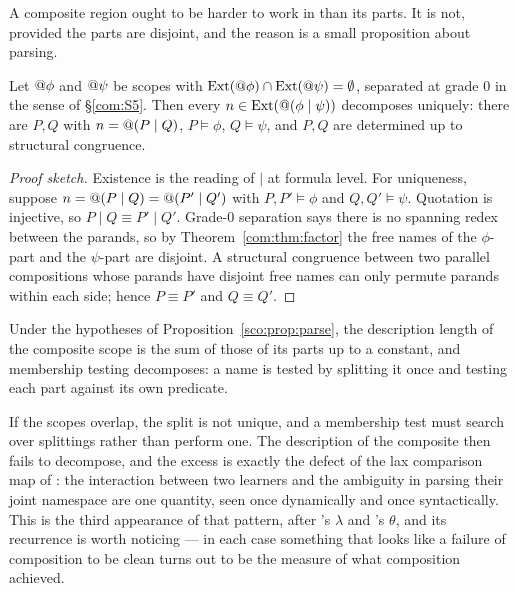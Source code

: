 A composite region ought to be harder to work in than its parts. It is
not, provided the parts are disjoint, and the reason is a small
proposition about parsing.

\begin{proposition}
\label{sco:prop:parse}
Let $@\phi$ and $@\psi$ be scopes with
$\mathrm{Ext}(@\phi) \cap \mathrm{Ext}(@\psi) = \emptyset$, separated at grade
$0$ in the sense of \S\ref{com:S5}. Then every
$n \in \mathrm{Ext}(@(\phi \mid \psi))$ decomposes uniquely: there are $P, Q$
with $n = @(P \mid Q)$, $P \models \phi$, $Q \models \psi$, and $P,Q$
are determined up to structural congruence.
\end{proposition}

\begin{proof}[Proof sketch]
Existence is the reading of $\mid$ at formula level. For uniqueness,
suppose $n = @(P \mid Q) = @(P' \mid Q')$ with
$P, P' \models \phi$ and $Q, Q' \models \psi$. Quotation is injective, so
$P \mid Q \equiv P' \mid Q'$. Grade-$0$ separation says there is no
spanning redex between the parands, so by
Theorem~\ref{com:thm:factor} the free names of the $\phi$-part and the
$\psi$-part are disjoint. A structural congruence between two parallel
compositions whose parands have disjoint free names can only permute
parands within each side; hence $P \equiv P'$ and $Q \equiv Q'$.
\end{proof}

\begin{corollary}
\label{sco:cor:additive}
Under the hypotheses of Proposition~\ref{sco:prop:parse}, the description
length of the composite scope is the sum of those of its parts up to a
constant, and membership testing decomposes: a name is tested by splitting
it once and testing each part against its own predicate.
\end{corollary}

\begin{remark}
\label{sco:rmk:overlap}
If the scopes overlap, the split is not unique, and a membership test must
search over splittings rather than perform one. The description of the
composite then fails to decompose, and the excess is exactly the defect of
the lax comparison map of \chComp: the interaction between two learners
and the ambiguity in parsing their joint namespace are one quantity, seen
once dynamically and once syntactically. This is the third appearance of
that pattern, after \chComp's $\lambda$ and \chEng's $\theta$, and its
recurrence is worth noticing --- in each case something that looks like a
failure of composition to be clean turns out to be the measure of what
composition achieved.
\end{remark}

